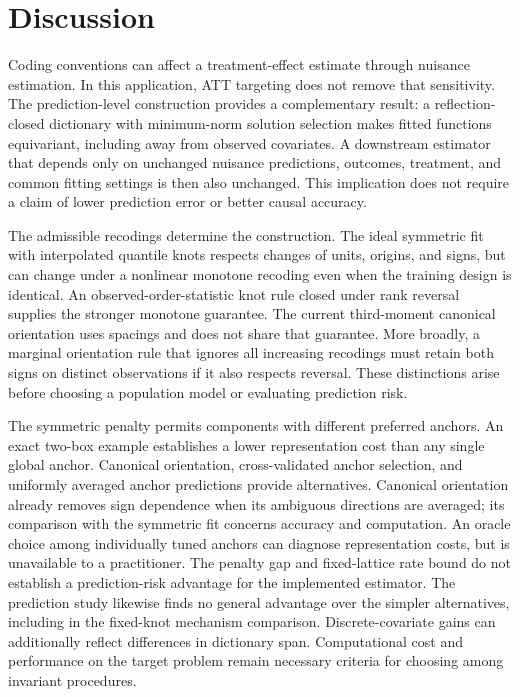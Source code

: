 \documentclass[11pt]{article}
\theoremstyle{definition}
\theoremstyle{remark}
\begin{document}
\section{Discussion}

Coding conventions can affect a treatment-effect estimate through nuisance
estimation. In this application, ATT targeting does not remove that
sensitivity. The prediction-level construction provides a complementary
result: a reflection-closed dictionary with minimum-norm solution selection
makes fitted functions equivariant, including away from observed covariates.
A downstream estimator that depends only on unchanged nuisance predictions,
outcomes, treatment, and common fitting settings is then also unchanged.
This implication does not require a claim of lower prediction error or
better causal accuracy.

The admissible recodings determine the construction. The ideal symmetric
fit with interpolated quantile knots respects changes of units, origins,
and signs, but can change under a nonlinear monotone recoding even when
the training design is identical. An observed-order-statistic knot rule
closed under rank reversal supplies the stronger monotone guarantee.
The current third-moment canonical orientation uses spacings and does not
share that guarantee. More broadly, a marginal orientation rule that ignores
all increasing recodings must retain both signs on distinct observations
if it also respects reversal. These distinctions arise before choosing a
population model or evaluating prediction risk.

The symmetric penalty permits components with different preferred anchors.
An exact two-box example establishes a lower representation cost than any
single global anchor. Canonical orientation, cross-validated anchor selection, and uniformly
averaged anchor predictions provide alternatives. Canonical orientation
already removes sign dependence when its ambiguous directions are averaged;
its comparison with the symmetric fit concerns accuracy and computation. An oracle choice
among individually tuned anchors can diagnose representation costs, but is
unavailable to a practitioner. The penalty gap and fixed-lattice rate
bound do not establish a prediction-risk advantage for the implemented
estimator. The prediction study likewise finds no general advantage over
the simpler alternatives, including in the fixed-knot mechanism comparison.
Discrete-covariate gains can additionally reflect differences in dictionary
span. Computational cost and performance on the target problem remain
necessary criteria for choosing among invariant procedures.
\end{document}
